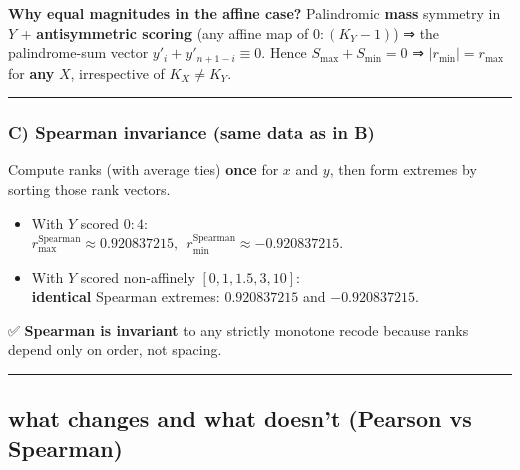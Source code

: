 \documentclass[
  12pt,
]{article}
\theoremstyle{plain}
\theoremstyle{definition}
\theoremstyle{remark}
\begin{document}
\textbf{Why equal magnitudes in the affine case?} Palindromic
\textbf{mass} symmetry in \(Y\) + \textbf{antisymmetric scoring} (any
affine map of \(0{:}(K_Y-1)\)) ⇒ the palindrome-sum vector
\(y'_i+y'_{n+1-i}\equiv 0\). Hence \(S_{\max}+S_{\min}=0\) ⇒
\(|r_{\min}|=r_{\max}\) for \textbf{any} \(X\), irrespective of
\(K_X\neq K_Y\).

\begin{center}\rule{0.5\linewidth}{0.5pt}\end{center}

\subsubsection{\texorpdfstring{C) \textbf{Spearman invariance (same data
as in
B)}}{C) Spearman invariance (same data as in B)}}\label{c-spearman-invariance-same-data-as-in-b}

Compute ranks (with average ties) \textbf{once} for \(x\) and \(y\),
then form extremes by sorting those rank vectors.

\begin{itemize}
\item
  With \(Y\) scored \(0{:}4\):\\
  \(r_{\max}^{\text{Spearman}}\approx 0.920837215,\ \ r_{\min}^{\text{Spearman}}\approx -0.920837215\).
\item
  With \(Y\) scored non-affinely \([0,1,1.5,3,10]\):\\
  \textbf{identical} Spearman extremes: \(0.920837215\) and
  \(-0.920837215\).
\end{itemize}

✅ \textbf{Spearman is invariant} to any strictly monotone recode
because ranks depend only on order, not spacing.

\begin{center}\rule{0.5\linewidth}{0.5pt}\end{center}

\subsection{what changes and what doesn't (Pearson vs
Spearman)}\label{what-changes-and-what-doesnt-pearson-vs-spearman}
\end{document}
